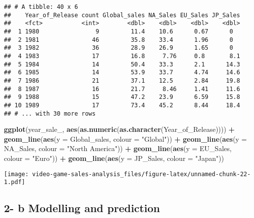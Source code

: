 \documentclass[]{article}
\newenvironment{Shaded}{\begin{snugshade}}{\end{snugshade}}
\newcommand{\DataTypeTok}[1]{\textcolor[rgb]{0.13,0.29,0.53}{#1}}
\newcommand{\KeywordTok}[1]{\textcolor[rgb]{0.13,0.29,0.53}{\textbf{#1}}}
\newcommand{\NormalTok}[1]{#1}
\newcommand{\OperatorTok}[1]{\textcolor[rgb]{0.81,0.36,0.00}{\textbf{#1}}}
\newcommand{\StringTok}[1]{\textcolor[rgb]{0.31,0.60,0.02}{#1}}
\begin{document}
\begin{verbatim}
## # A tibble: 40 x 6
##    Year_of_Release count Global_sales NA_Sales EU_Sales JP_Sales
##    <fct>           <int>        <dbl>    <dbl>    <dbl>    <dbl>
##  1 1980                9         11.4    10.6      0.67      0  
##  2 1981               46         35.8    33.4      1.96      0  
##  3 1982               36         28.9    26.9      1.65      0  
##  4 1983               17         16.8     7.76     0.8       8.1
##  5 1984               14         50.4    33.3      2.1      14.3
##  6 1985               14         53.9    33.7      4.74     14.6
##  7 1986               21         37.1    12.5      2.84     19.8
##  8 1987               16         21.7     8.46     1.41     11.6
##  9 1988               15         47.2    23.9      6.59     15.8
## 10 1989               17         73.4    45.2      8.44     18.4
## # ... with 30 more rows
\end{verbatim}

\begin{Shaded}
\begin{Highlighting}[]
\KeywordTok{ggplot}\NormalTok{(year_sale_, }\KeywordTok{aes}\NormalTok{(}\KeywordTok{as.numeric}\NormalTok{(}\KeywordTok{as.character}\NormalTok{(Year_of_Release)))) }\OperatorTok{+}\StringTok{ }
\StringTok{  }\KeywordTok{geom_line}\NormalTok{(}\KeywordTok{aes}\NormalTok{(}\DataTypeTok{y =}\NormalTok{ Global_sales, }\DataTypeTok{colour =} \StringTok{"Global"}\NormalTok{)) }\OperatorTok{+}\StringTok{ }
\StringTok{  }\KeywordTok{geom_line}\NormalTok{(}\KeywordTok{aes}\NormalTok{(}\DataTypeTok{y =}\NormalTok{ NA_Sales, }\DataTypeTok{colour =} \StringTok{"North America"}\NormalTok{)) }\OperatorTok{+}
\StringTok{  }\KeywordTok{geom_line}\NormalTok{(}\KeywordTok{aes}\NormalTok{(}\DataTypeTok{y =}\NormalTok{ EU_Sales, }\DataTypeTok{colour =} \StringTok{"Euro"}\NormalTok{)) }\OperatorTok{+}
\StringTok{  }\KeywordTok{geom_line}\NormalTok{(}\KeywordTok{aes}\NormalTok{(}\DataTypeTok{y =}\NormalTok{ JP_Sales, }\DataTypeTok{colour =} \StringTok{"Japan"}\NormalTok{)) }
\end{Highlighting}
\end{Shaded}

\texttt{[image: video-game-sales-analysis\_files/figure-latex/unnamed-chunk-22-1.pdf]}

\hypertarget{b-modelling-and-prediction}{%
\subsection{2- b Modelling and
prediction}\label{b-modelling-and-prediction}}
\end{document}
